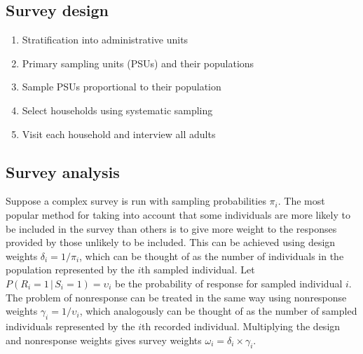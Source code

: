 \documentclass[a4paper, nobind]{templates/ociamthesis}
\providecommand{\tightlist}{%
  \setlength{\itemsep}{0pt}\setlength{\parskip}{0pt}}
\begin{document}
\hypertarget{survey-design}{%
\subsection{Survey design}\label{survey-design}}

\begin{enumerate}
\def\labelenumi{\arabic{enumi}.}
\tightlist
\item
  Stratification into administrative units
\item
  Primary sampling units (PSUs) and their populations
\item
  Sample PSUs proportional to their population
\item
  Select households using systematic sampling
\item
  Visit each household and interview all adults
\end{enumerate}

\hypertarget{survey-analysis}{%
\subsection{Survey analysis}\label{survey-analysis}}

Suppose a complex survey is run with sampling probabilities \(\pi_i\).
The most popular method for taking into account that some individuals are more likely to be included in the survey than others is to give more weight to the responses provided by those unlikely to be included.
This can be achieved using design weights \(\delta_i = 1 / \pi_i\), which can be thought of as the number of individuals in the population represented by the \(i\)th sampled individual.
Let \(P(R_i = 1 \, | \, S_i = 1) = \upsilon_i\) be the probability of response for sampled individual \(i\).
The problem of nonresponse can be treated in the same way using nonresponse weights \(\gamma_i = 1 / \upsilon_i\), which analogously can be thought of as the number of sampled individuals represented by the \(i\)th recorded individual.
Multiplying the design and nonresponse weights gives survey weights \(\omega_i = \delta_i \times \gamma_i\).
\end{document}
